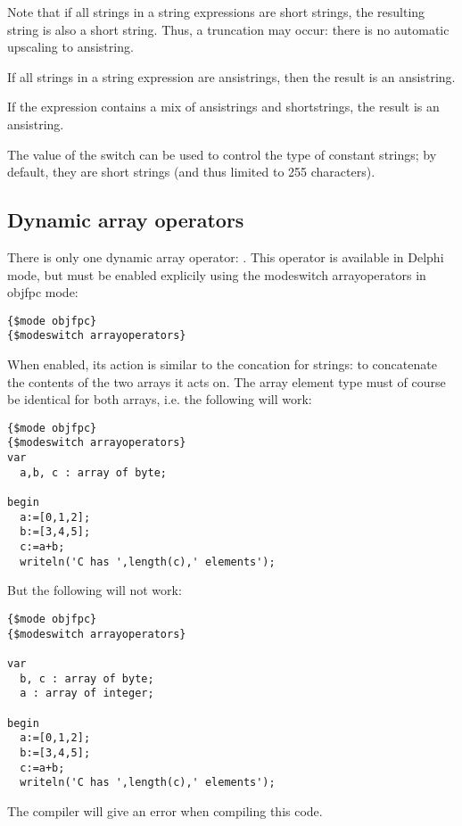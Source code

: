 Note that if all strings in a string expressions are short strings, the
resulting string is also a short string. Thus, a truncation may occur:
there is no automatic upscaling to ansistring.

If all strings in a string expression are ansistrings, then the result is an
ansistring.

If the expression contains a mix of ansistrings and shortstrings, the result
is an ansistring.

The value of the  switch can be used to control the type of
constant strings; by default, they are short strings (and thus limited to
255 characters).

%
\subsection{Dynamic array operators}
There is only one dynamic array operator: \var{+}. This operator is
available in Delphi mode, but must be enabled explicily using the modeswitch
arrayoperators in objfpc mode:
\begin{verbatim}
{$mode objfpc}
{$modeswitch arrayoperators}
\end{verbatim}
When enabled, its action is similar to
the concation for strings: to concatenate the contents of the two arrays it acts on.
The array element type must of course be identical for both arrays, i.e. the
following will work:
\begin{verbatim}
{$mode objfpc}
{$modeswitch arrayoperators}
var
  a,b, c : array of byte;

begin
  a:=[0,1,2];
  b:=[3,4,5];
  c:=a+b;
  writeln('C has ',length(c),' elements');
\end{verbatim}
But the following will not work:
\begin{verbatim}
{$mode objfpc}
{$modeswitch arrayoperators}

var
  b, c : array of byte;
  a : array of integer;

begin
  a:=[0,1,2];
  b:=[3,4,5];
  c:=a+b;
  writeln('C has ',length(c),' elements');
\end{verbatim}
The compiler will give an error when compiling this code.

%
